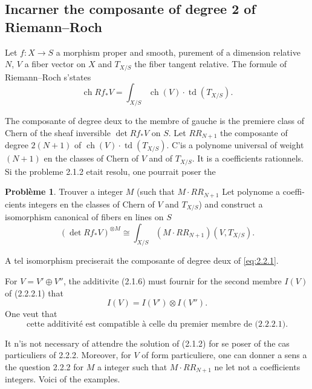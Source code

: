 \documentclass[12pt,a4paper]{article}
\theoremstyle{plain}
\theoremstyle{definition}
\newtheorem{probleme}[theorem]{Probl\`eme}
\DeclareMathOperator{\ch}{ch}
\DeclareMathOperator{\td}{td}
\begin{document}
\subsection{Incarner the composante of degree 2 of Riemann--Roch}

Let $f: X \to S$ a morphism proper and smooth, purement of a dimension
relative $N$, $V$ a fiber vector on $X$ and $T_{X/S}$ the fiber tangent relative.
The formule of Riemann--Roch s'states
\begin{equation}\label{eq:2.2.1}
\ch Rf_* V = \int_{X/S} \ch(V) \cdot \td(T_{X/S}) .
\end{equation}

The composante of degree deux to the membre of gauche is the premiere class of
Chern of the sheaf inversible $\det Rf_* V$ on $S$. Let $RR_{N+1}$ the composante
of degree $2(N+1)$ of $\ch(V) \cdot \td(T_{X/S})$. C'is a polynome universal of weight
$(N+1)$ en the classes of Chern of $V$ and of $T_{X/S}$. It is a coefficients
rationnels. Si the probleme 2.1.2 etait resolu, one pourrait poser the

\begin{probleme}
Trouver a integer $M$ (such that $M \cdot RR_{N+1}$ Let polynome a coeffi-
cients integers en the classes of Chern of $V$ and $T_{X/S}$) and construct a isomorphism
canonical of fibers en lines on $S$
\begin{equation}\label{eq:2.2.2.1}
(\det Rf_* V)^{\otimes M} \cong \textstyle \int_{X/S} (M \cdot RR_{N+1})(V, T_{X/S}) .
\end{equation}
\end{probleme}

A tel isomorphism preciserait the composante of degree deux of \eqref{eq:2.2.1}.

For $V = V' \oplus V''$, the additivite (2.1.6) must fournir for the second membre
$I(V)$ of (2.2.2.1) that
\[
I(V) = I(V') \otimes I(V'') .
\]
One veut that
\begin{equation}\label{eq:2.2.3}
\text{cette additivit\'e est compatible \`a celle du premier membre de (2.2.2.1).}
\end{equation}

It n'is not necessary of attendre the solution of (2.1.2) for se poser of the
cas particuliers of 2.2.2. Moreover, for $V$ of form particuliere, one can
donner a sens a the question 2.2.2 for $M$ a integer such that $M \cdot RR_{N+1}$ ne let
not a coefficients integers. Voici of the examples.

\subsubsection{}
\end{document}
